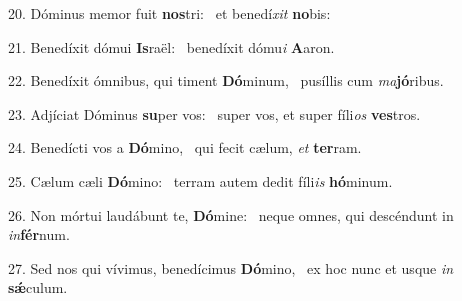 20. Dóminus memor fuit \textbf{nos}tri: \ast\  et benedí\textit{xit} \textbf{no}bis:\

21. Benedíxit dómui \textbf{Is}raël: \ast\  benedíxit dómu\textit{i} \textbf{A}aron.\

22. Benedíxit ómnibus, qui timent \textbf{Dó}minum, \ast\  pusíllis cum \textit{ma}\textbf{jó}ribus.\

23. Adjíciat Dóminus \textbf{su}per vos: \ast\  super vos, et super fíli\textit{os} \textbf{ves}tros.\

24. Benedícti vos a \textbf{Dó}mino, \ast\  qui fecit cælum, \textit{et} \textbf{ter}ram.\

25. Cælum cæli \textbf{Dó}mino: \ast\  terram autem dedit fíli\textit{is} \textbf{hó}minum.\

26. Non mórtui laudábunt te, \textbf{Dó}mine: \ast\  neque omnes, qui descéndunt in \textit{in}\textbf{fér}num.\

27. Sed nos qui vívimus, benedícimus \textbf{Dó}mino, \ast\  ex hoc nunc et usque \textit{in} \textbf{sǽ}culum.\

